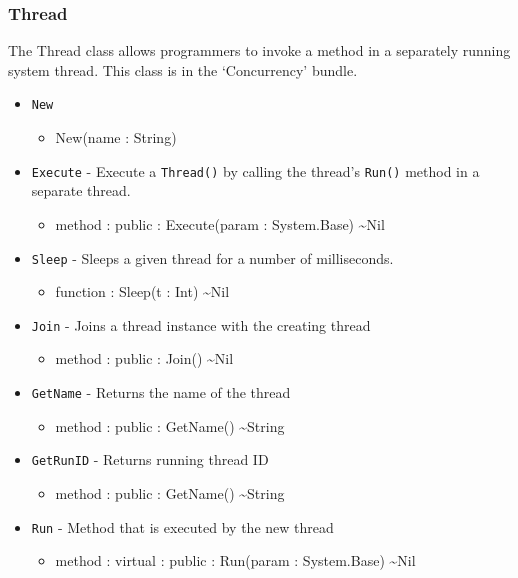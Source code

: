 \documentclass[12pt]{article}
\begin{document}
\subsubsection{Thread}
The Thread class allows programmers to invoke a method in a separately
running system thread.  This class is in the `Concurrency' bundle.  
\begin{itemize}
\item \texttt{New}
  \begin{itemize}
  \item New(name : String)
  \end{itemize}
\item \texttt{Execute} - Execute a \texttt{Thread()} by calling the
  thread's \texttt{Run()} method in a separate thread.
  \begin{itemize}
  \item method : public : Execute(param : System.Base) \textasciitilde Nil
  \end{itemize}
\item \texttt{Sleep} - Sleeps a given thread for a number of
  milliseconds.
  \begin{itemize}
  \item function : Sleep(t : Int) \textasciitilde Nil
  \end{itemize}
\item \texttt{Join} - Joins a thread instance with the creating thread
  \begin{itemize}
  \item method : public : Join() \textasciitilde Nil
  \end{itemize}
\item \texttt{GetName} - Returns the name of the thread
  \begin{itemize}
  \item method : public : GetName() \textasciitilde String
  \end{itemize}
\item \texttt{GetRunID} - Returns running thread ID
  \begin{itemize}
  \item method : public : GetName() \textasciitilde String
  \end{itemize}
\item \texttt{Run} - Method that is executed by the new thread
  \begin{itemize}
  \item method : virtual : public : Run(param : System.Base) \textasciitilde Nil
  \end{itemize}
\end{itemize}
\end{document}

